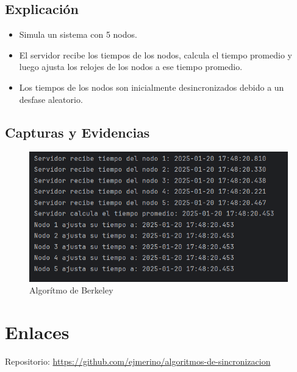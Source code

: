 \documentclass[a4paper,12pt]{report}
\begin{document}
\subsection{Explicación}
\begin{itemize}
    \item Simula un sistema con 5 nodos.
    \item El servidor recibe los tiempos de los nodos, calcula el tiempo promedio y luego ajusta los relojes de los nodos a ese tiempo promedio.
    \item Los tiempos de los nodos son inicialmente desincronizados debido a un desfase aleatorio.
\end{itemize}

\subsection{Capturas y Evidencias}
\begin{figure}
    \centering
    \includegraphics[width=1\linewidth]{images/berkeley.png}
    \caption{Algorítmo de Berkeley}
    \label{fig:enter-label}
\end{figure}

\section{Enlaces} 
Repositorio: \url{https://github.com/ejmerino/algoritmos-de-sincronizacion}
\end{document}
